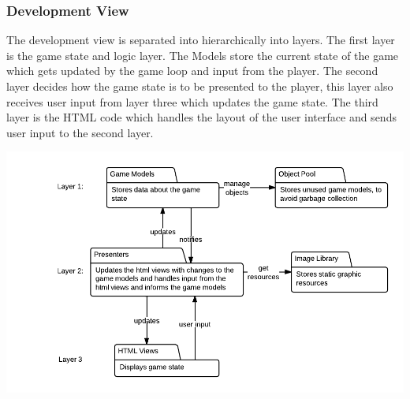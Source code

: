 \subsubsection{Development View}

The development view is separated into hierarchically into layers. The first layer is the game state 
and logic layer. The Models store the current state of the game which gets updated by the game loop 
and input from the player. The second layer decides how the game state is to be presented to the 
player, this layer also receives user input from layer three which updates the game state. The third 
layer is the HTML code which handles the layout of the user interface and sends user input to the
second layer.

\includegraphics[width=\textwidth]{pictures/development_view}
